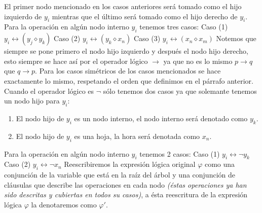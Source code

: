 \documentclass[a4paper]{article}
\begin{document}
El primer nodo mencionado en los casos anteriores será tomado como el hijo izquierdo de \(y_{i}\) mientras que el último será tomado como el hijo derecho de \(y_{i}\).
\newline
Para la operación en algún nodo interno \(y_{i}\) tenemos tres casos:
\newline
Caso (1)
\newline 
\(y_{i} \longleftrightarrow \left(y_{j} \diamond y_{k}\right)\)
\newline 
Caso (2)
\newline 
\(y_{i} \longleftrightarrow \left(y_{k} \diamond x_{n}\right)\)
\newline 
Caso (3)
\newline 
\(y_{i} \longleftrightarrow \left(x_{n} \diamond x_{m}\right)\)
\newline 
Notemos que siempre se pone primero el nodo hijo izquierdo y después el nodo hijo derecho, esto siempre se hace así por el operador lógico \(\longrightarrow\) ya que no es 
lo mismo \(p \longrightarrow q\) que \(q \longrightarrow p\). 
\newline 
Para los casos simétricos de los casos mencionados se hace exactamente lo mismo, respetando el orden que definimos en el párrafo anterior.
\newline
Cuando el operador lógico es \(\neg\) sólo tenemos dos casos ya que solemante tenemos un nodo hijo para \(y_{i}\):
\begin{enumerate}
    \item El nodo hijo de \(y_{i}\) es un nodo interno, el nodo interno será denotado como \(y_{k}\).
    \item El nodo hijo de \(y_{i}\) es una hoja, la hora será denotada como \(x_{n}\).
\end{enumerate}
Para la operación en algún nodo interno \(y_{i}\) tenemos 2 casos:
\newline
Caso (1)
\newline 
\(y_{i} \longleftrightarrow \neg y_{k}\)
\newline 
Caso (2)
\newline 
\(y_{i} \longleftrightarrow \neg x_{n}\)
\newline 
Reescribiremos la expresión lógica original \(\varphi\) como una conjunción de la variable que está en la raíz del árbol y una conjunción 
de cláusulas que describe las operaciones en cada nodo \textit{(éstas operaciones ya han sido descritas y cubiertas en todos su casos)}, 
a ésta reescritura de la expresión lógica \(\varphi\) la denotaremos como \(\varphi'\).
\end{document}
